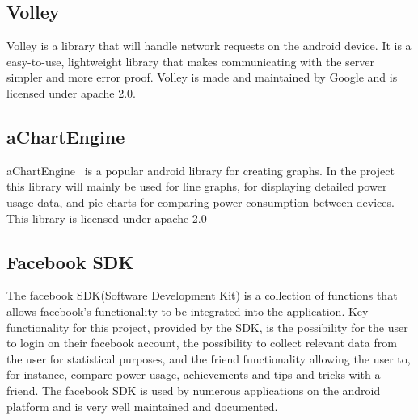 \subsection{Volley}
Volley is a library that will handle network requests on the android device. It is a easy-to-use, lightweight library that makes communicating with the server simpler and more error proof.  Volley is made and maintained by Google and is licensed under apache 2.0.

\subsection{aChartEngine}
aChartEngine~\cite{achart} is a popular android library for creating graphs. In the project this library will mainly be used for line graphs, for displaying detailed power usage data, and pie charts for comparing power consumption between devices. This library is licensed under apache 2.0~\cite{apache}

\subsection{Facebook SDK}
The facebook SDK(Software Development Kit) is a collection of functions that allows facebook’s functionality to be integrated into the application. Key functionality for this project, provided by the SDK, is the possibility for the user to login on their facebook account, the possibility to collect  relevant data from the user for statistical purposes, and the friend functionality allowing the user to, for instance, compare power usage, achievements and tips and tricks with a friend. The facebook SDK is used by numerous applications on the android platform and is very well maintained and documented. 

